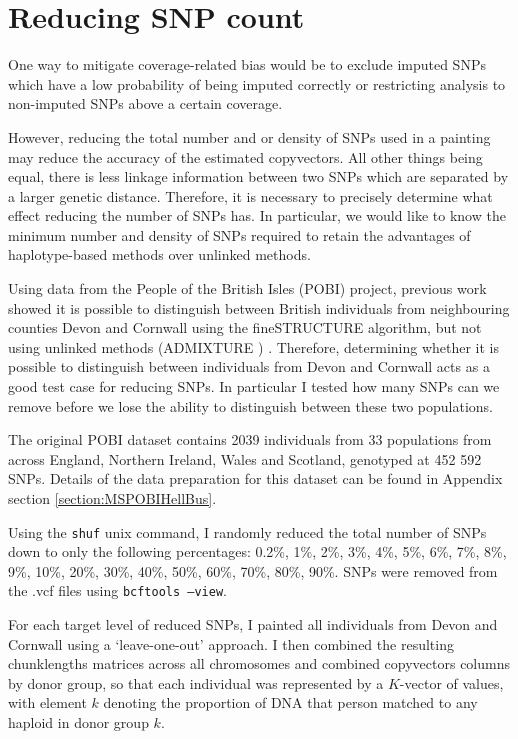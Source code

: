\section{Reducing SNP count} \label{sec:ReducingSNPcount}

One way to mitigate coverage-related bias would be to exclude imputed SNPs which have a low probability of being imputed correctly or restricting analysis to non-imputed SNPs above a certain coverage.

However, reducing the total number and or density of SNPs used in a painting may reduce the accuracy of the estimated copyvectors. All other things being equal, there is less linkage information between two SNPs which are separated by a larger genetic distance. Therefore, it is necessary to precisely determine what effect reducing the number of SNPs has. In particular, we would like to know the minimum number and density of SNPs required to retain the advantages of haplotype-based methods over unlinked methods. 

Using data from the People of the British Isles (POBI) project, previous work showed it is possible to distinguish between British individuals from neighbouring counties Devon and Cornwall using the fineSTRUCTURE algorithm, but not using unlinked methods (ADMIXTURE \cite{alexander2009fast}) \cite{Leslie2015}. Therefore, determining whether it is possible to distinguish between individuals from Devon and Cornwall acts as a good test case for reducing SNPs. In particular I tested how many SNPs can we remove before we lose the ability to distinguish between these two populations.


The original POBI dataset contains 2039 individuals from 33 populations from across England, Northern Ireland, Wales and Scotland, genotyped at 452 592 SNPs. Details of the data preparation for this dataset can be found in Appendix section \ref{section:MSPOBIHellBus}.

Using the \texttt{shuf} unix command, I randomly reduced the total number of SNPs down to only the following percentages: 0.2\%, 1\%, 2\%, 3\%, 4\%, 5\%, 6\%, 7\%, 8\%, 9\%, 10\%, 20\%, 30\%, 40\%, 50\%, 60\%, 70\%, 80\%, 90\%. SNPs were removed from the .vcf files using \texttt{bcftools --view}.

For each target level of reduced SNPs, I painted all individuals from Devon and Cornwall using a `leave-one-out' approach. I then combined the resulting chunklengths matrices across all chromosomes and combined copyvectors columns by donor group, so that each individual was represented by a $K$-vector of values, with element $k$ denoting the proportion of DNA that person matched to any haploid in donor group $k$.

